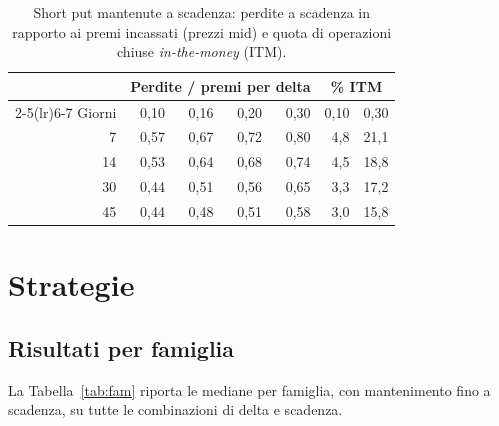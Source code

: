 \documentclass[11pt,a4paper]{article}
\begin{document}
\begin{table}[ht]\centering\small
\caption{Short put mantenute a scadenza: perdite a scadenza in rapporto ai premi incassati (prezzi mid) e quota di operazioni chiuse \emph{in-the-money} (ITM).}\label{tab:ins}
\begin{tabular}{rrrrrrr}\toprule
 & \multicolumn{4}{c}{Perdite / premi per delta} & \multicolumn{2}{c}{\% ITM} \\ \cmidrule(lr){2-5}\cmidrule(lr){6-7}
Giorni & 0{,}10 & 0{,}16 & 0{,}20 & 0{,}30 & 0{,}10 & 0{,}30 \\ \midrule
7 & 0{,}57 & 0{,}67 & 0{,}72 & 0{,}80 & 4{,}8 & 21{,}1 \\
14 & 0{,}53 & 0{,}64 & 0{,}68 & 0{,}74 & 4{,}5 & 18{,}8 \\
30 & 0{,}44 & 0{,}51 & 0{,}56 & 0{,}65 & 3{,}3 & 17{,}2 \\
45 & 0{,}44 & 0{,}48 & 0{,}51 & 0{,}58 & 3{,}0 & 15{,}8 \\
\bottomrule\end{tabular}\end{table}

\section{Strategie}\label{sec:strat}

\subsection{Risultati per famiglia}

La Tabella~\ref{tab:fam} riporta le mediane per famiglia, con mantenimento fino a scadenza, su tutte le combinazioni di delta e scadenza.
\end{document}

